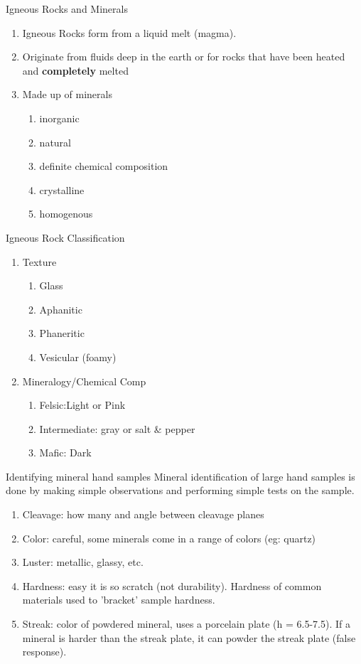 \documentclass[ignorenonframetext,slidestop]{beamer}
\begin{document}
\begin{frame}{Igneous Rocks and Minerals}
  \begin{enumerate}
  \item Igneous Rocks form from a liquid melt (magma).
  \item Originate from fluids deep in the earth or for rocks that have been heated and \textbf{completely} melted
  \item Made up of minerals
    \begin{enumerate}
    \item inorganic
    \item natural
    \item definite chemical composition
    \item crystalline
    \item homogenous
    \end{enumerate}
  \end{enumerate}
\end{frame}

\begin{frame}{Igneous Rock Classification}
  \begin{enumerate}
  \item{Texture}
    \begin{enumerate}
    \item Glass
    \item Aphanitic
    \item Phaneritic
    \item Vesicular (foamy)
    \end{enumerate}
    
  \item{Mineralogy/Chemical Comp}
    \begin{enumerate}
    \item Felsic:Light or Pink
    \item Intermediate: gray or salt \& pepper 
    \item Mafic: Dark
    \end{enumerate}
  \end{enumerate}
\end{frame}

\begin{frame}{Identifying mineral hand samples}
  Mineral identification of large hand samples is done by making simple observations and performing simple tests on the sample.
  \begin{enumerate}
  \item Cleavage: how many and angle between cleavage planes
  \item Color: careful, some minerals come in a range of colors (eg: quartz)
  \item Luster: metallic, glassy, etc.
  \item Hardness: easy it is so scratch (not durability). Hardness of common materials used to 'bracket' sample hardness.
  \item Streak: color of powdered mineral, uses a porcelain plate (h = 6.5-7.5). If a mineral is harder than the streak plate, it can powder the
     streak plate (false response).
  \end{enumerate}
\end{frame}
\end{document}
